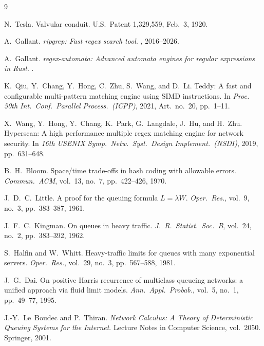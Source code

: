 \documentclass[11pt,letterpaper]{article}
\begin{document}
\begin{thebibliography}{9}

N.~Tesla.
\newblock Valvular conduit.
\newblock U.S.~Patent 1{,}329{,}559, Feb.~3, 1920.

A.~Gallant.
\newblock \emph{ripgrep: Fast regex search tool}.
\newblock {}, 2016--2026.

A.~Gallant.
\newblock \emph{regex-automata: Advanced automata engines for regular
  expressions in Rust}.
.

K.~Qiu, Y.~Chang, Y.~Hong, C.~Zhu, S.~Wang, and D.~Li.
\newblock Teddy: A fast and configurable multi-pattern matching engine using
  SIMD instructions.
\newblock In \emph{Proc. 50th Int.\ Conf.\ Parallel Process.\ (ICPP)}, 2021,
  Art.\ no.~20, pp.~1--11.

X.~Wang, Y.~Hong, Y.~Chang, K.~Park, G.~Langdale, J.~Hu, and H.~Zhu.
\newblock Hyperscan: A high performance multiple regex matching engine for
  network security.
\newblock In \emph{16th USENIX Symp.\ Netw.\ Syst.\ Design Implement.\
  (NSDI)}, 2019, pp.~631--648.

B.~H.~Bloom.
\newblock Space/time trade-offs in hash coding with allowable errors.
\newblock \emph{Commun.\ ACM}, vol.~13, no.~7, pp.~422--426, 1970.

J.~D.~C.~Little.
\newblock A proof for the queuing formula $L=\lambda W$.
\newblock \emph{Oper.\ Res.}, vol.~9, no.~3, pp.~383--387, 1961.

J.~F.~C.~Kingman.
\newblock On queues in heavy traffic.
\newblock \emph{J.\ R.\ Statist.\ Soc.\ B}, vol.~24, no.~2, pp.~383--392,
  1962.

S.~Halfin and W.~Whitt.
\newblock Heavy-traffic limits for queues with many exponential servers.
\newblock \emph{Oper.\ Res.}, vol.~29, no.~3, pp.~567--588, 1981.

J.~G.~Dai.
\newblock On positive Harris recurrence of multiclass queueing networks: a
  unified approach via fluid limit models.
\newblock \emph{Ann.\ Appl.\ Probab.}, vol.~5, no.~1, pp.~49--77, 1995.

J.-Y.~Le~Boudec and P.~Thiran.
\newblock \emph{Network Calculus: A Theory of Deterministic Queuing Systems
  for the Internet}.
\newblock Lecture Notes in Computer Science, vol.~2050. Springer, 2001.


\end{thebibliography}
\end{document}
